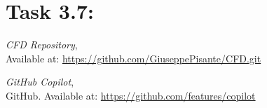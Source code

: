 \documentclass{article}
\begin{document}
\section*{\Large Task 3.7:}

\begin{thebibliography}{9}
    \textit{CFD Repository},\\
    Available at: \url{https://github.com/GiuseppePisante/CFD.git}
    
    \textit{GitHub Copilot},\\
    GitHub. Available at: \url{https://github.com/features/copilot}
    \end{thebibliography}
\end{document}
